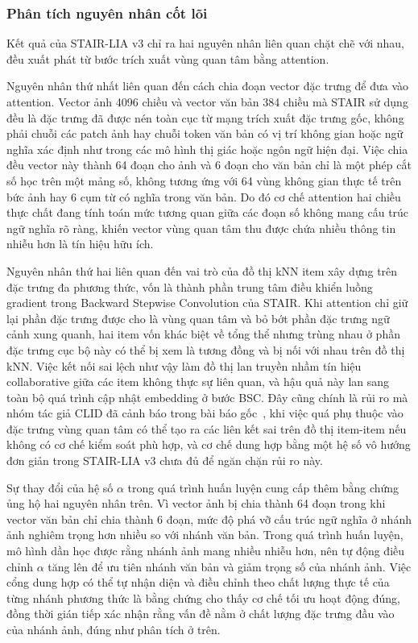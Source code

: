 \subsubsection{Phân tích nguyên nhân cốt lõi}

Kết quả của STAIR-LIA v3 chỉ ra hai nguyên nhân liên quan chặt chẽ với nhau, đều xuất phát từ bước trích xuất vùng quan tâm bằng attention.

Nguyên nhân thứ nhất liên quan đến cách chia đoạn vector đặc trưng để đưa vào attention. Vector ảnh 4096 chiều và vector văn bản 384 chiều mà STAIR sử dụng đều là đặc trưng đã được nén toàn cục từ mạng trích xuất đặc trưng gốc, không phải chuỗi các patch ảnh hay chuỗi token văn bản có vị trí không gian hoặc ngữ nghĩa xác định như trong các mô hình thị giác hoặc ngôn ngữ hiện đại. Việc chia đều vector này thành 64 đoạn cho ảnh và 6 đoạn cho văn bản chỉ là một phép cắt số học trên một mảng số, không tương ứng với 64 vùng không gian thực tế trên bức ảnh hay 6 cụm từ có nghĩa trong văn bản. Do đó cơ chế attention hai chiều thực chất đang tính toán mức tương quan giữa các đoạn số không mang cấu trúc ngữ nghĩa rõ ràng, khiến vector vùng quan tâm thu được chứa nhiều thông tin nhiễu hơn là tín hiệu hữu ích.

Nguyên nhân thứ hai liên quan đến vai trò của đồ thị kNN item xây dựng trên đặc trưng đa phương thức, vốn là thành phần trung tâm điều khiển luồng gradient trong Backward Stepwise Convolution của STAIR. Khi attention chỉ giữ lại phần đặc trưng được cho là vùng quan tâm và bỏ bớt phần đặc trưng ngữ cảnh xung quanh, hai item vốn khác biệt về tổng thể nhưng trùng nhau ở phần đặc trưng cục bộ này có thể bị xem là tương đồng và bị nối với nhau trên đồ thị kNN. Việc kết nối sai lệch như vậy làm đồ thị lan truyền nhầm tín hiệu collaborative giữa các item không thực sự liên quan, và hậu quả này lan sang toàn bộ quá trình cập nhật embedding ở bước BSC. Đây cũng chính là rủi ro mà nhóm tác giả CLID đã cảnh báo trong bài báo gốc~\cite{qi2026clid}, khi việc quá phụ thuộc vào đặc trưng vùng quan tâm có thể tạo ra các liên kết sai trên đồ thị item-item nếu không có cơ chế kiểm soát phù hợp, và cơ chế dung hợp bằng một hệ số vô hướng đơn giản trong STAIR-LIA v3 chưa đủ để ngăn chặn rủi ro này.

Sự thay đổi của hệ số $\alpha$ trong quá trình huấn luyện cung cấp thêm bằng chứng ủng hộ hai nguyên nhân trên. Vì vector ảnh bị chia thành 64 đoạn trong khi vector văn bản chỉ chia thành 6 đoạn, mức độ phá vỡ cấu trúc ngữ nghĩa ở nhánh ảnh nghiêm trọng hơn nhiều so với nhánh văn bản. Trong quá trình huấn luyện, mô hình dần học được rằng nhánh ảnh mang nhiều nhiễu hơn, nên tự động điều chỉnh $\alpha$ tăng lên để ưu tiên nhánh văn bản và giảm trọng số của nhánh ảnh. Việc cổng dung hợp có thể tự nhận diện và điều chỉnh theo chất lượng thực tế của từng nhánh phương thức là bằng chứng cho thấy cơ chế tối ưu hoạt động đúng, đồng thời gián tiếp xác nhận rằng vấn đề nằm ở chất lượng đặc trưng đầu vào của nhánh ảnh, đúng như phân tích ở trên.


